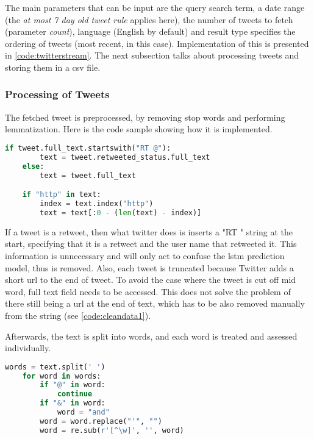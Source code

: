             The main parameters that can be input are the query search term, a date range (the \textit{at most 7 day old tweet rule} applies here), the number of tweets to fetch (parameter \textit{count}), language (English by default) and result type specifies the ordering of tweets (most recent, in this case). Implementation of this is presented in \cref{code:twitterstream}. The next subsection talks about processing tweets and storing them in a \gls{csv} file.
            
        \subsubsection{Processing of Tweets}
            The fetched tweet is preprocessed, by removing stop words and performing lemmatization. Here is the code sample showing how it is implemented.
            
            \begin{lstlisting}[language=Python, caption=Cleaning of Data (Part 1), label=code:cleandata1]
    if tweet.full_text.startswith("RT @"):
        text = tweet.retweeted_status.full_text
    else:
        text = tweet.full_text

    if "http" in text:
        index = text.index("http")
        text = text[:0 - (len(text) - index)]
            \end{lstlisting}
            \FloatBarrier
            
            If a tweet is a retweet, then what twitter does is inserts a "RT \@" string at the start, specifying that it is a retweet and the user name that retweeted it. This information is unnecessary and will only act to confuse the \gls{lstm} prediction model, thus is removed. Also, each tweet is truncated because Twitter adds a short \gls{url} to the end of tweet. To avoid the case where the tweet is cut off mid word, full text field needs to be accessed. This does not solve the problem of there still being a \gls{url} at the end of text, which has to be also removed manually from the string (see \cref{code:cleandata1}).
            
            Afterwards, the text is split into words, and each word is treated and assessed individually.
            
            \begin{lstlisting}[language=Python, caption=Cleaning of Data (Part 2), label=code:cleandata2]
    words = text.split(' ')
    for word in words:
        if "@" in word:
            continue
        if "&" in word:
            word = "and"
        word = word.replace("'", "")
        word = re.sub(r'[^\w]', '', word)
            \end{lstlisting}
            \FloatBarrier
            

